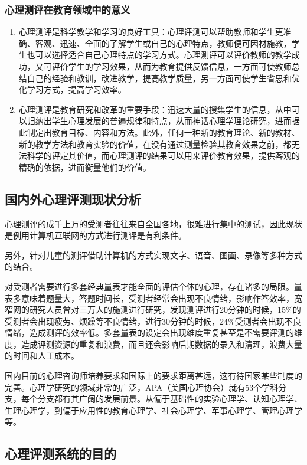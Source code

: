 \subsubsection{心理测评在教育领域中的意义}

\begin{enumerate}
\item 心理测评是科学教学和学习的良好工具：心理评测可以帮助教师和学生更准确、客观、迅速、全面的了解学生或自己的心理特点，教师便可因材施教，学生也可以选择适合自己心理特点的学习方式。心理测评可以评价教师的教学成功，又可评价学生的学习效果，从而为教育提供反馈信息，一方面可使教师总结自己的经验和教训，改进教学，提高教学质量，另一方面可使学生省思和优化学习方式，提高学习效率。
\item 心理测评是教育研究和改革的重要手段：迅速大量的搜集学生的信息，从中可以归纳出学生心理发展的普遍规律和特点，从而神话心理学理论研究，进而据此制定出教育目标、内容和方法。此外，任何一种新的教育理论、新的教材、新的教学方法和教育实验的价值，在没有通过测量检验其教育效果之前，都无法科学的评定其价值，而心理测评的结果可以用来评价教育效果，提供客观的精确的依据，进而衡量他们的价值。
\end{enumerate}

\subsection{国内外心理评测现状分析}

心理测评的成千上万的受测者往往来自全国各地，很难进行集中的测试，因此现状是例用计算机互联网的方式进行测评是有利条件。

另外，针对儿童的测评借助计算机的方式实现文字、语音、图画、录像等多种方式的结合。

对受测者需要进行多套经典量表才能全面的评估个体的心理，存在诸多的局限。量表多意味着题量大，答题时间长，受测者经常会出现不良情绪，影响作答效率，宽窄网的研究人员曾对三万人的施测进行研究，发现测评进行20分钟的时候，15\%的受测者会出现疲劳、烦躁等不良情绪，进行30分钟的时候，24\%受测者会出现不良情绪，造成测评的效率低。多套量表的设定会出现维度重复甚至是不需要评测的维度，造成评测资源的重复和浪费，而且还会影响后期数据的录入和清理，浪费大量的时间和人工成本。

国内目前的心理咨询师培养要求和国际上的要求距离甚远，这有待国家某些制度的完善。心理学研究的领域非常的广泛，APA（美国心理协会）就有53个学科分支，每个分支都有其广阔的发展前景。从偏于基础性的实验心理学、认知心理学、生理心理学，到偏于应用性的教育心理学、社会心理学、军事心理学、管理心理学等。

\subsection{心理评测系统的目的}


